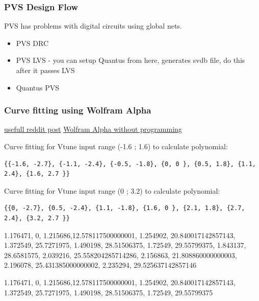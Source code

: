 
\subsubsection*{PVS Design Flow}

PVS has problems with digital circuits using global nets.

\begin{itemize}
	\item PVS DRC 
	\item PVS LVS - you can setup Quantus from here, generates svdb file, do this after it passes LVS
	\item Quantus PVS 
\end{itemize}


\subsubsection*{Curve fitting using Wolfram Alpha}

\href{https://www.reddit.com/r/arduino/comments/12b7t9p/hello_everyone_im_trying_to_get_the_polynomial/}{usefull reddit post}
\href{https://www.wolframalpha.com/input?i=curve+fitting}{Wolfram Alpha without programming}

Curve fitting for Vtune input range (-1.6 ; 1.6) to calculate polynomial:

\begin{verbatim}
{{-1.6, -2.7}, {-1.1, -2.4}, {-0.5, -1.8}, {0, 0 }, {0.5, 1.8}, {1.1, 2.4}, {1.6, 2.7 }}	
\end{verbatim}
Curve fitting for Vtune input range (0 ; 3.2) to calculate polynomial:
\begin{verbatim}
{{0, -2.7}, {0.5, -2.4}, {1.1, -1.8}, {1.6, 0 }, {2.1, 1.8}, {2.7, 2.4}, {3.2, 2.7 }}		
\end{verbatim}
{{1.176471, 0}, {1.215686,12.578117500000001}, {1.254902, 20.840017142857143}, {1.372549, 25.7271975}, {1.490198, 28.51506375}, {1.72549, 29.55799375}, {1.843137, 28.6581575}, {2.039216, 25.558204285714286}, {2.156863, 21.808860000000003}, {2.196078, 25.431385000000002}, {2.235294, 29.525637142857146}}
		

{{1.176471, 0}, {1.215686,12.578117500000001}, {1.254902, 20.840017142857143}, {1.372549, 25.7271975}, {1.490198, 28.51506375}, {1.72549, 29.55799375}}
	
